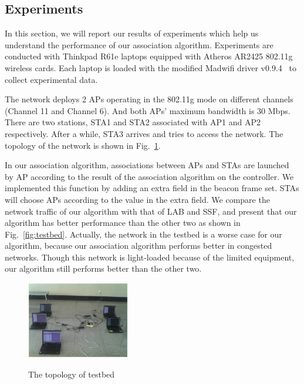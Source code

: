 \documentclass[conference]{IEEEtran}
\def\figwidth{0.4\textwidth}
\begin{document}
  \subsection{Experiments}

  In this section, we will report our results of experiments which help us understand the performance of our association algorithm.  Experiments are conducted with Thinkpad R61e laptops equipped with Atheros AR2425 802.11g wireless cards.  Each laptop is loaded with the modified Madwifi driver v0.9.4~\cite{madwifi} to collect experimental data.


  The network deploys 2 APs operating in the 802.11g mode on different channels (Channel 11 and Channel 6).  And both APs' maximum bandwidth is 30 Mbps.  There are two stations, STA1 and STA2 associated with AP1 and AP2 respectively.  After a while, STA3 arrives and tries to access the network.  The topology of the network is shown in Fig.~\ref{fig:topology_testbed}.

  In our association algorithm, associations between APs and STAs are launched by AP according to the result of the association algorithm on the controller.  We implemented this function by adding an extra field in the beacon frame set.  STAs will choose APs according to the value in the extra field.  We compare the network traffic of our algorithm with that of LAB and SSF, and present that our algorithm has better performance than the other two as shown in Fig.~\ref{fig:testbed}.  Actually, the network in the testbed is a worse case for our algorithm, because our association algorithm performs better in congested networks. Though this network is light-loaded because of the limited equipment, our algorithm still performs better than the other two.



  \begin{figure}[!ht]
    \centering
    \includegraphics[width=\figwidth]{topology_testbed.eps}\\\texttt{\texttt{}}
    \caption{The topology of testbed}\label{fig:topology_testbed}
  \end{figure}
\end{document}
